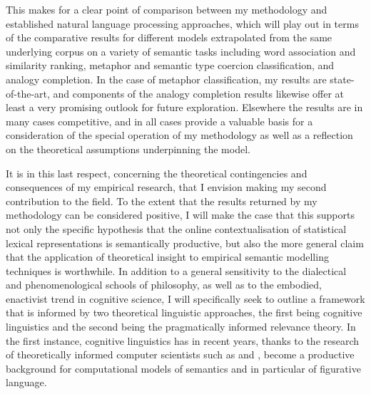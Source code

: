 This makes for a clear point of comparison between my methodology and established natural language processing approaches, which will play out in terms of the comparative results for different models extrapolated from the same underlying corpus on a variety of semantic tasks including word association and similarity ranking, metaphor and semantic type coercion classification, and analogy completion.  In the case of metaphor classification, my results are state-of-the-art, and components of the analogy completion results likewise offer at least a very promising outlook for future exploration.  Elsewhere the results are in many cases competitive, and in all cases provide a valuable basis for a consideration of the special operation of my methodology as well as a reflection on the theoretical assumptions underpinning the model.

It is in this last respect, concerning the theoretical contingencies and consequences of my empirical research, that I envision making my second contribution to the field.  To the extent that the results returned by my methodology can be considered positive, I will make the case that this supports not only the specific hypothesis that the online contextualisation of statistical lexical representations is semantically productive, but also the more general claim that the application of theoretical insight to empirical semantic modelling techniques is worthwhile.  In addition to a general sensitivity to the dialectical and phenomenological schools of philosophy, as well as to the embodied, enactivist trend in cognitive science, I will specifically seek to outline a framework that is informed by two theoretical linguistic approaches, the first being cognitive linguistics and the second being the pragmatically informed relevance theory.  In the first instance, cognitive linguistics has in recent years, thanks to the research of theoretically informed computer scientists such as \cite{Barnden2008} and \cite{ShutovaEA2013}, become a productive background for computational models of semantics and in particular of figurative language.

